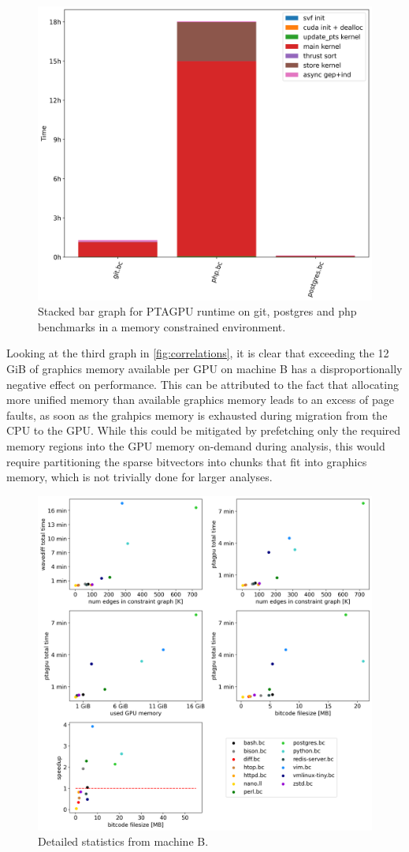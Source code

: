 \begin{figure}
    \centering
    \includegraphics[width=.6\textwidth]{img/stackedbar-problems.png}
    \caption[Stacked bar graph for PTAGPU runtime on git, postgres and php benchmarks.]{Stacked bar graph for PTAGPU runtime on git, postgres and php benchmarks in a memory constrained environment.}
    \label{fig:stackedbar-problem}
\end{figure}
Looking at the third graph in \autoref{fig:correlations}, it is clear that exceeding the 12 GiB of graphics memory available per GPU on machine B has a disproportionally negative effect on performance.
This can be attributed to the fact that allocating more unified memory than available graphics memory leads to an excess of page faults, as soon as the grahpics memory is exhausted during migration from the CPU to the GPU. 
While this could be mitigated by prefetching only the required memory regions into the GPU memory on-demand during analysis, this would require partitioning the sparse bitvectors into chunks that fit into graphics memory, which is not trivially done for larger analyses.
\begin{figure}
    \centering
    \includegraphics[width=.9\textwidth]{img/correlations.png}
    \caption{Detailed statistics from machine B.}
    \label{fig:correlations}
\end{figure}

